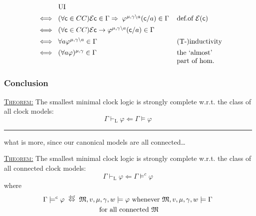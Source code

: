 \documentclass[xcolor=x11names]{beamer}
\newcommand{\defekv}[1][.1]{\hspace{#1cm}\overset{\textup{\tiny def}}{ \Leftrightarrow }\hspace{#1cm}}
\newcommand{\lthen}{\rightarrow}
\newcommand{\forallin}[2]{(\forall #1 \in #2)}
\newcommand{\derives}[1][]{\vdash_{\mathrm{#1}}}
\newenvironment{tomb}[2][.1]{\arraycolsep=#1cm\begin{array}{#2}}{\end{array}}
\begin{document}
\begin{frame}[t]
\begin{itemize}
\[\begin{tomb}[.1]{rclll}
     && \textup{UI}
\\[1ex] &\iff & \forallin {\mathsf c} {CC}\mathcal E \mathsf c \in \Gamma \Rightarrow \;\varphi^{\mu, \gamma\setminus a}(\mathsf c/a) \in \Gamma
     && \textup{def.of $\mathcal E(\mathsf c)$}
\\[1ex] &\iff & \forallin {\mathsf c} {CC}\mathcal E \mathsf c \lthen \varphi^{\mu, \gamma\setminus a}(\mathsf c/a) \in \Gamma
     && \textup{}
\\[1ex] &\iff & \forall a \varphi^{\mu, \gamma\setminus a} \in \Gamma
     && \textup{(T-)inductivity}
\\[1ex] &\iff & (\forall a \varphi)^{\mu, \gamma} \in \Gamma
     && \textup{the `almost'}
\\ && && \textup{part of hom.}
 \end{tomb}\]
\end{itemize}
\end{frame}

\begin{frame}
\frametitle{Conclusion}
\footnotesize

\underline{\textsc{Theorem:}} The smallest minimal clock logic is strongly complete w.r.t. the class of all clock models:
\[ \Gamma \derives[L] \varphi \mathrel{\Longleftarrow} \Gamma \models \varphi \]

\bigskip
\hrule
\bigskip

what is more, since our canonical models are all connected\dots

\bigskip

\underline{\textsc{Theorem:}}
The smallest minimal clock logic is strongly complete w.r.t. the class of all connected clock models:
\[ \Gamma \derives[L] \varphi \mathrel{\Longleftarrow} \Gamma \models^c \varphi \]
where
\begin{multline*}
\Gamma \models^c \varphi \defekv  \mathfrak M, v, \mu, \gamma, w \models \varphi \textup{ whenever } \mathfrak M, v, \mu, \gamma, w \models \Gamma \\ \textup{ for all connected $\mathfrak M$}\end{multline*}

\end{frame}
\end{document}
